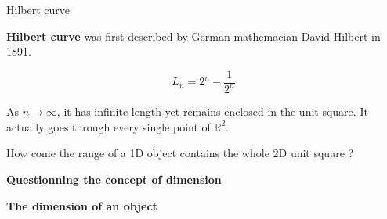 \documentclass[usenames, dvipsnames, aspectratio=169]{beamer}
\begin{document}
\begin{frame}[t, c]{Hilbert curve}{}
\begin{minipage}{.28\textwidth}
\begin{overprint}
    \end{overprint}
  \end{minipage}%
  \hfill
  \begin{minipage}{.68\textwidth}
    \begin{overprint}
      \textbf{Hilbert curve} was first described by German mathemacian David Hilbert in 1891.

      \[
      L_n = 2^n - \dfrac{1}{2^n}
      \]

      As $n \to \infty$, it has infinite length yet remains enclosed in the unit square.
      It actually goes through every single point of $\mathbb{R}^2$.

      How come the range of a 1D object contains the whole 2D unit square ?
    \end{overprint}
  \end{minipage}

  \vfill
\end{frame}

{



  \begin{frame}[fragile]{}{}
    \vfill
    \centering
    \Large
    \textbf{\color{black} Questionning the concept of dimension}

    \bigskip

    \large
    \textbf{\color{gray} The dimension of an object}
    \vfill
  \end{frame}
}
\end{document}
